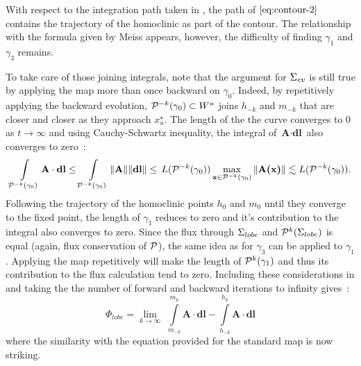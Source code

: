With respect to the integration path taken in , the path of $\eqref{eq:contour-2}$ contains the trajectory of the homoclinic as part of the contour. The relationship with the formula given by Meiss appears, however, the difficulty of finding $\gamma_1$ and $\gamma_3$ remains. 

To take care of those joining integrals, note that the argument for $\Sigma_{ev}$ is still true by applying the map more than once backward on $\gamma_0$. Indeed, by repetitively applying the backward evolution, $\mathcal{P}^{-k}(\gamma_0)\subset W^u$ joins $h_{-k}$ and $m_{-k}$ that are closer and closer as they approach $x_u^\star$. The length of the the curve converges to 0 as $t\to\infty$ and using Cauchy-Schwartz inequality, the integral of $\textbf{A}\cdot\textbf{dl}$ also converges to zero~:
\begin{equation*}
    \int\limits_{\mathcal{P}^{-k}(\gamma_0)} \textbf{A}\cdot\textbf{dl} \leq \int\limits_{\mathcal{P}^{-k}(\gamma_0)} \Vert\textbf{A}\Vert \Vert\textbf{dl}\Vert \leq\, L(\mathcal{P}^{-k}(\gamma_0))\max\limits_{\textbf{x} \in\mathcal{P}^{-k}(\gamma_0)}\Vert\textbf{A(\textbf{x})}\Vert \lesssim L(\mathcal{P}^{-k}(\gamma_0)).
\end{equation*}
Following the trajectory of the homoclinic points $h_0$ and $m_0$ until they converge to the fixed point, the length of $\gamma_1$ reduces to zero and it's contribution to the integral also converges to zero. Since the flux through $\Sigma_{lobe}$ and $\mathcal{P}^k(\Sigma_{lobe})$ is equal (again, flux conservation of $\mathcal{P}$), the same idea as for $\gamma_3$ can be applied to $\gamma_1$. Applying the map repetitively will make the length of $\mathcal{P}^k(\gamma_1)$ and thus its contribution to the flux calculation tend to zero. Including these considerations in  and taking the the number of forward and backward iterations to infinity gives~:
\begin{equation}\label{eq:flux-algorithm}
    \Phi_{lobe} = \lim\limits_{k\to\infty}\,\,\int\limits_{m_{-k}}^{m_{k}}\textbf{A}\cdot\textbf{dl} - \int\limits_{h_{-k}}^{h_{k}}\textbf{A}\cdot\textbf{dl}
\end{equation}
where the similarity with the equation provided for the standard map \cite[Eq. 21]{meiss_thirty_2015} is now striking.

